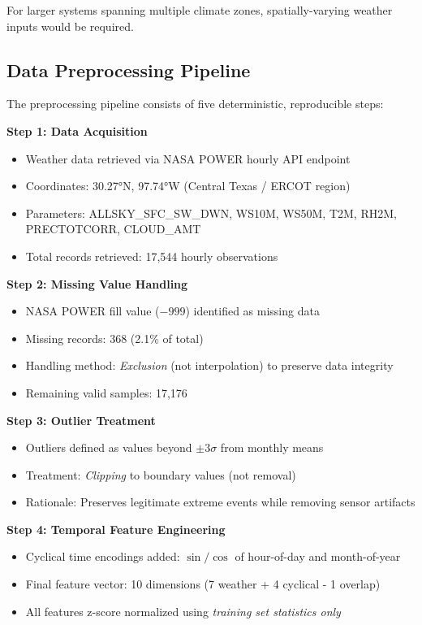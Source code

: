 \documentclass[journal,12pt,onecolumn]{IEEEtran}
\begin{document}
For larger systems spanning multiple climate zones, spatially-varying weather inputs would be required.

\subsection{Data Preprocessing Pipeline}
\label{subsec:preprocessing}

The preprocessing pipeline consists of five deterministic, reproducible steps:

\textbf{Step 1: Data Acquisition}
\begin{itemize}
    \item Weather data retrieved via NASA POWER hourly API endpoint
    \item Coordinates: 30.27°N, 97.74°W (Central Texas / ERCOT region)
    \item Parameters: ALLSKY\_SFC\_SW\_DWN, WS10M, WS50M, T2M, RH2M, PRECTOTCORR, CLOUD\_AMT
    \item Total records retrieved: 17,544 hourly observations
\end{itemize}

\textbf{Step 2: Missing Value Handling}
\begin{itemize}
    \item NASA POWER fill value ($-999$) identified as missing data
    \item Missing records: 368 (2.1\% of total)
    \item Handling method: \textit{Exclusion} (not interpolation) to preserve data integrity
    \item Remaining valid samples: 17,176
\end{itemize}

\textbf{Step 3: Outlier Treatment}
\begin{itemize}
    \item Outliers defined as values beyond $\pm 3\sigma$ from monthly means
    \item Treatment: \textit{Clipping} to boundary values (not removal)
    \item Rationale: Preserves legitimate extreme events while removing sensor artifacts
\end{itemize}

\textbf{Step 4: Temporal Feature Engineering}
\begin{itemize}
    \item Cyclical time encodings added: $\sin/\cos$ of hour-of-day and month-of-year
    \item Final feature vector: 10 dimensions (7 weather + 4 cyclical - 1 overlap)
    \item All features z-score normalized using \textit{training set statistics only}
\end{itemize}
\end{document}
